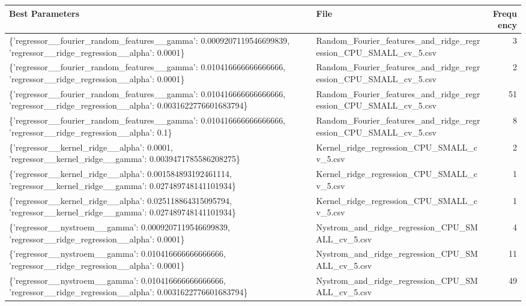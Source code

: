 \begin{tabularx}{\textwidth}{llr}
\toprule
                                                                                                                 Best Parameters &                                                            File &  Frequency \\
\midrule
              \{'regressor\_\_fourier\_random\_features\_\_gamma': 0.0009207119546699839, 'regressor\_\_ridge\_regression\_\_alpha': 0.0001\} & Random\_Fourier\_features\_and\_ridge\_regression\_CPU\_SMALL\_cv\_5.csv &          3 \\
               \{'regressor\_\_fourier\_random\_features\_\_gamma': 0.010416666666666666, 'regressor\_\_ridge\_regression\_\_alpha': 0.0001\} & Random\_Fourier\_features\_and\_ridge\_regression\_CPU\_SMALL\_cv\_5.csv &          2 \\
\{'regressor\_\_fourier\_random\_features\_\_gamma': 0.010416666666666666, 'regressor\_\_ridge\_regression\_\_alpha': 0.0031622776601683794\} & Random\_Fourier\_features\_and\_ridge\_regression\_CPU\_SMALL\_cv\_5.csv &         51 \\
                  \{'regressor\_\_fourier\_random\_features\_\_gamma': 0.010416666666666666, 'regressor\_\_ridge\_regression\_\_alpha': 0.1\} & Random\_Fourier\_features\_and\_ridge\_regression\_CPU\_SMALL\_cv\_5.csv &          8 \\
                             \{'regressor\_\_kernel\_ridge\_\_alpha': 0.0001, 'regressor\_\_kernel\_ridge\_\_gamma': 0.0039471785586208275\} &                      Kernel\_ridge\_regression\_CPU\_SMALL\_cv\_5.csv &          2 \\
                \{'regressor\_\_kernel\_ridge\_\_alpha': 0.001584893192461114, 'regressor\_\_kernel\_ridge\_\_gamma': 0.027489748141101934\} &                      Kernel\_ridge\_regression\_CPU\_SMALL\_cv\_5.csv &          1 \\
                \{'regressor\_\_kernel\_ridge\_\_alpha': 0.025118864315095794, 'regressor\_\_kernel\_ridge\_\_gamma': 0.027489748141101934\} &                      Kernel\_ridge\_regression\_CPU\_SMALL\_cv\_5.csv &          1 \\
                             \{'regressor\_\_nystroem\_\_gamma': 0.0009207119546699839, 'regressor\_\_ridge\_regression\_\_alpha': 0.0001\} &                 Nystrom\_and\_ridge\_regression\_CPU\_SMALL\_cv\_5.csv &          4 \\
                              \{'regressor\_\_nystroem\_\_gamma': 0.010416666666666666, 'regressor\_\_ridge\_regression\_\_alpha': 0.0001\} &                 Nystrom\_and\_ridge\_regression\_CPU\_SMALL\_cv\_5.csv &         11 \\
               \{'regressor\_\_nystroem\_\_gamma': 0.010416666666666666, 'regressor\_\_ridge\_regression\_\_alpha': 0.0031622776601683794\} &                 Nystrom\_and\_ridge\_regression\_CPU\_SMALL\_cv\_5.csv &         49 \\
\bottomrule
\end{tabularx}
